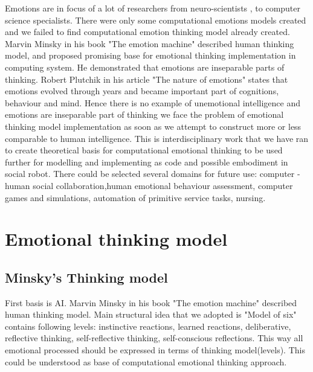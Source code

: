 Emotions are in focus of a lot of researchers from neuro-scientists \cite{emotionsbraintorobot, parsingreward, neuromodulatory, cubeofemotions}, to computer science specialists\cite{emotionandsociable, senticcomputing, hourglass, affectivemodelofinterplay, affectivecomputing, affectivecomputingchallanges}.
There were only some computational emotions models created\cite{computationalmodelsemotion, computationalmodelsemotionscognition, evaluatingcomutationalmodel, threelevel} and we failed to find computational emotion thinking model already created. Marvin Minsky in his book "The emotion machine"\cite{emotionmachine} described human thinking model, and proposed promising base for emotional thinking implementation in computing system. He demonstrated that emotions are inseparable parts of thinking. Robert Plutchik in his article "The nature of emotions" \cite{natureofemotions} states that emotions evolved through years and became important part of cognitions, behaviour and mind. Hence there is no example of unemotional intelligence and emotions are inseparable part of thinking we face the problem of emotional thinking model implementation as soon as we attempt to construct more or less comparable to human intelligence. This is interdisciplinary work that we have ran to create theoretical basis for computational emotional thinking to be used further for modelling and implementing as code and possible embodiment in social robot. There could be selected several domains for future use: computer - human social collaboration,human emotional behaviour assessment, computer games and simulations, automation of primitive service tasks, nursing.

\section{Emotional thinking model}

\subsection{Minsky's Thinking model}

First basis is  AI. Marvin Minsky in his book "The emotion machine"\cite{emotionmachine} described human thinking model. Main structural idea that we adopted is "Model of six" contains following levels: instinctive reactions, learned reactions, deliberative, reflective thinking, self-reflective thinking, self-conscious reflections. This way all emotional processed should be expressed in terms of thinking model(levels). This could be understood as base of computational emotional thinking approach.

